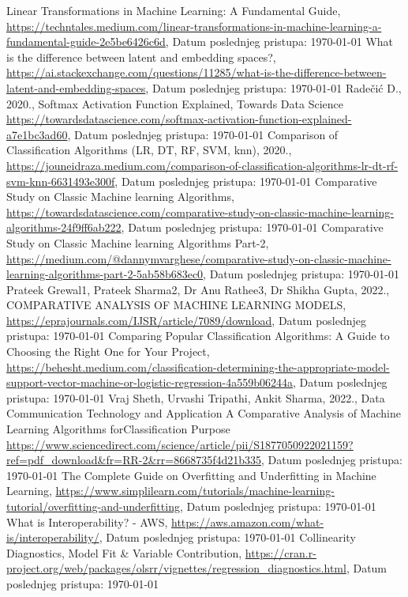 \documentclass[fontsize=12bp, paper=a4]{scrarticle}
\begin{document}
\begin{thebibliography}{1}
    Linear Transformations in Machine Learning: A Fundamental Guide, \url{https://techntales.medium.com/linear-transformations-in-machine-learning-a-fundamental-guide-2e5be6426c6d}, Datum poslednjeg pristupa: \today
    What is the difference between latent and embedding spaces?,
\url{https://ai.stackexchange.com/questions/11285/what-is-the-difference-between-latent-and-embedding-spaces}, Datum poslednjeg pristupa: \today
    Radečić D., 2020., Softmax Activation Function Explained, Towards Data Science
    \url{https://towardsdatascience.com/softmax-activation-function-explained-a7e1bc3ad60}, Datum poslednjeg pristupa: \today
    Comparison of Classification Algorithms (LR, DT, RF, SVM, knn), 2020., \url{https://jouneidraza.medium.com/comparison-of-classification-algorithms-lr-dt-rf-svm-knn-6631493e300f}, Datum poslednjeg pristupa: \today
    Comparative Study on Classic Machine learning Algorithms, \url{https://towardsdatascience.com/comparative-study-on-classic-machine-learning-algorithms-24f9ff6ab222}, Datum poslednjeg pristupa: \today
    Comparative Study on Classic Machine learning Algorithms Part-2, \url{https://medium.com/@dannymvarghese/comparative-study-on-classic-machine-learning-algorithms-part-2-5ab58b683ec0}, Datum poslednjeg pristupa: \today
    Prateek Grewal1, Prateek Sharma2, Dr Anu Rathee3, Dr Shikha Gupta, 2022., COMPARATIVE ANALYSIS OF MACHINE LEARNING MODELS, \url{https://eprajournals.com/IJSR/article/7089/download}, Datum poslednjeg pristupa: \today
    Comparing Popular Classification Algorithms: A Guide to Choosing the Right One for Your Project, \url{https://behesht.medium.com/classification-determining-the-appropriate-model-support-vector-machine-or-logistic-regression-4a559b06244a}, Datum poslednjeg pristupa: \today
    Vraj Sheth, Urvashi Tripathi, Ankit Sharma, 2022., Data Communication Technology and Application A Comparative Analysis of Machine Learning Algorithms forClassification Purpose  \url{https://www.sciencedirect.com/science/article/pii/S1877050922021159?ref=pdf_download&fr=RR-2&rr=8668735f4d21b335}, Datum poslednjeg pristupa: \today
    The Complete Guide on Overfitting and Underfitting in Machine Learning, \url{https://www.simplilearn.com/tutorials/machine-learning-tutorial/overfitting-and-underfitting}, Datum poslednjeg pristupa: \today
    What is Interoperability? - AWS, \url{https://aws.amazon.com/what-is/interoperability/}, Datum poslednjeg pristupa: \today
    Collinearity Diagnostics, Model Fit \& Variable Contribution, \url{https://cran.r-project.org/web/packages/olsrr/vignettes/regression_diagnostics.html}, Datum poslednjeg pristupa: \today


\end{thebibliography}
\end{document}
